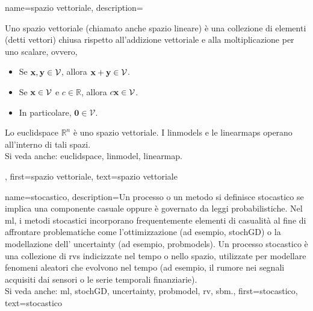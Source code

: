 

{name={spazio vettoriale},
	description={Uno spazio vettoriale (chiamato anche spazio lineare) è una 
	collezione di elementi (detti vettori) chiusa rispetto all'addizione vettoriale e alla moltiplicazione per uno scalare, ovvero,
		\begin{itemize}
			\item Se ${\bf x}, {\bf y} \in \mathcal{V}$, allora ${\bf x} + {\bf y} \in \mathcal{V}$.
			\item Se ${\bf x} \in \mathcal{V}$ e $c \in \mathbb{R}$, allora $c {\bf x} \in \mathcal{V}$.
			\item In particolare, $\mathbf{0} \in \mathcal{V}$.
		\end{itemize}
		Lo \gls{euclidspace} $\mathbb{R}^n$ è uno spazio vettoriale.
		I \glspl{linmodel} e le \glspl{linearmap} operano all'interno di tali spazi.\\
		Si veda anche: \gls{euclidspace}, \gls{linmodel}, \gls{linearmap}.},
	first={spazio vettoriale},
	text={spazio vettoriale}
}


{name={stocastico},
	description={Un processo o un metodo si definisce stocastico se implica 
	una componente casuale oppure è governato da leggi probabilistiche. Nel \gls{ml}, i metodi 
	stocastici incorporano frequentemente elementi di casualità al fine di affrontare problematiche 
	come l'ottimizzazione (ad esempio, \gls{stochGD})
	o la modellazione dell' \gls{uncertainty} (ad esempio, \glspl{probmodel}). Un processo stocastico è una collezione
		di \glspl{rv} indicizzate nel tempo o nello spazio, utilizzate per modellare fenomeni aleatori 
		che evolvono nel tempo (ad esempio, il rumore nei segnali acquisiti dai sensori o le serie temporali finanziarie).\\
		Si veda anche:  \gls{ml}, \gls{stochGD}, \gls{uncertainty}, \gls{probmodel}, \gls{rv}, \gls{sbm}.},
	first={stocastico},
	text={stocastico}
}

